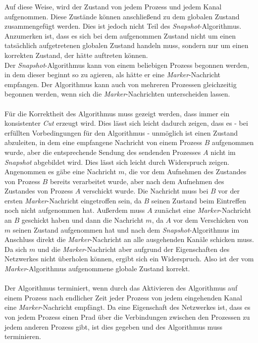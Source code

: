 \documentclass[ngerman]{fbi-aufgabenblatt}
\begin{document}
Auf diese Weise, wird der Zustand von jedem Prozess und jedem Kanal aufgenommen. Diese Zustände können anschließend zu dem globalen Zustand zusammengefügt werden. Dies ist jedoch nicht Teil des \textit{Snapshot}-Algorithmus. Anzumerken ist, dass es sich bei dem aufgenommen Zustand nicht um einen tatsächlich aufgetretenen globalen Zustand handeln muss, sondern nur um einen korrekten Zustand, der hätte auftreten können. \\
Der \textit{Snapshot}-Algorithmus kann von einem beliebigen Prozess begonnen werden, in dem dieser beginnt so zu agieren, als hätte er eine \textit{Marker}-Nachricht empfangen. Der Algorithmus kann auch von mehreren Prozessen gleichzeitig begonnen werden, wenn sich die \textit{Marker}-Nachrichten unterscheiden lassen. \\
\\
Für die Korrektheit des Algorithmus muss gezeigt werden, dass immer ein konsistenter \textit{Cut} erzeugt wird. Dies lässt sich leicht dadurch zeigen, dass es - bei erfüllten Vorbedingungen für den Algorithmus - unmöglich ist einen Zustand abzuleiten, in dem eine empfangene Nachricht von einem Prozess $B$ aufgenommen wurde, aber die entsprechende Sendung des sendenden Prozesses $A$ nicht im \textit{Snapshot} abgebildet wird. Dies lässt sich leicht durch Widerspruch zeigen. Angenommen es gäbe eine Nachricht $m$, die vor dem Aufnehmen des Zustandes von Prozess $B$ bereits verarbeitet wurde, aber nach dem Aufnehmen des Zustandes von Prozess $A$ verschickt wurde. Die Nachricht muss bei $B$ vor der ersten \textit{Marker}-Nachricht eingetroffen sein, da $B$ seinen Zustand beim Eintreffen noch nicht aufgenommen hat. Außerdem muss $A$ zunächst eine \textit{Marker}-Nachricht an $B$ geschickt haben und dann die Nachricht $m$, da $A$ vor dem Verschicken von $m$ seinen Zustand aufgenommen hat und nach dem \textit{Snapshot}-Algorithmus im Anschluss direkt die \textit{Marker}-Nachricht an alle ausgehenden Kanäle schicken muss. Da sich $m$ und die \textit{Marker}-Nachricht aber aufgrund der Eigenschaften des Netzwerkes nicht überholen können, ergibt sich ein Widerspruch. Also ist der vom \textit{Marker}-Algorithmus aufgenommene globale Zustand korrekt. \\
\\
Der Algorithmus terminiert, wenn durch das Aktivieren des Algorithmus auf einem Prozess nach endlicher Zeit jeder Prozess von jedem eingehenden Kanal eine \textit{Marker}-Nachricht empfängt. Da eine Eigenschaft des Netzwerkes ist, dass es von jedem Prozess einen Prad über die Verbindungen zwischen den Prozessen zu jedem anderen Prozess gibt, ist dies gegeben und des Algorithmus muss terminieren.
\end{document}
